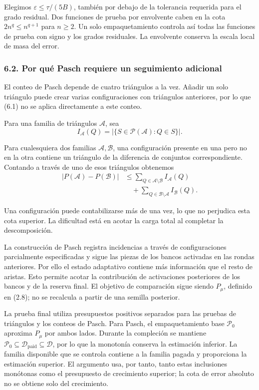 \documentclass[spanish,11pt,a4paper]{article}
\begin{document}
Elegimos \(\varepsilon\leq\tau/(5B)\), también por debajo de la tolerancia requerida para el grado residual. Dos funciones de prueba por envolvente caben en la cota \(2n^q\leq n^{q+1}\) para \(n\geq2\). Un solo empaquetamiento controla así todas las funciones de prueba con signo y los grados residuales. La envolvente conserva la escala local de masa del error.

\subsubsection{6.2. Por qué Pasch requiere un seguimiento adicional}\label{por-quuxe9-pasch-requiere-un-seguimiento-adicional}

El conteo de Pasch depende de cuatro triángulos a la vez. Añadir un solo triángulo puede crear varias configuraciones con triángulos anteriores, por lo que (6.1) no se aplica directamente a este conteo.

Para una familia de triángulos \(\mathcal A\), sea
\[I_{\mathcal A}(Q)=
|\{S\in\mathcal P(\mathcal A):Q\in S\}|.\]

Para cualesquiera dos familias \(\mathcal A,\mathcal B\), una configuración presente en una pero no en la otra contiene un triángulo de la diferencia de conjuntos correspondiente. Contando a través de uno de esos triángulos obtenemos
\[\begin{aligned}
|P(\mathcal A)-P(\mathcal B)|
&\leq\sum_{Q\in\mathcal A\setminus\mathcal B}I_{\mathcal A}(Q)\\
&\quad+\sum_{Q\in\mathcal B\setminus\mathcal A}I_{\mathcal B}(Q).
\end{aligned}                                                       \tag{6.2}\]

Una configuración puede contabilizarse más de una vez, lo que no perjudica esta cota superior. La dificultad está en acotar la carga total al completar la descomposición.

La construcción de Pasch registra incidencias a través de configuraciones parcialmente especificadas y sigue las piezas de los bancos activadas en las rondas anteriores. Por ello el estado adaptativo contiene más información que el resto de aristas. Esto permite acotar la contribución de activaciones posteriores de los bancos y de la reserva final. El objetivo de comparación sigue siendo \(P_\mu\), definido en (2.8); no se recalcula a partir de una semilla posterior.

La prueba final utiliza presupuestos positivos separados para las pruebas de triángulos y los conteos de Pasch. Para Pasch, el empaquetamiento base \(\mathcal P_0\) aproxima \(P_\mu\) por ambos lados. Durante la compleción se mantiene \(\mathcal P_0\subseteq\mathcal D_{\mathrm{paid}}\subseteq\mathcal D\), por lo que la monotonía conserva la estimación inferior. La familia disponible que se controla contiene a la familia pagada y proporciona la estimación superior. El argumento usa, por tanto, tanto estas inclusiones monótonas como el presupuesto de crecimiento superior; la cota de error absoluto no se obtiene solo del crecimiento.
\end{document}
